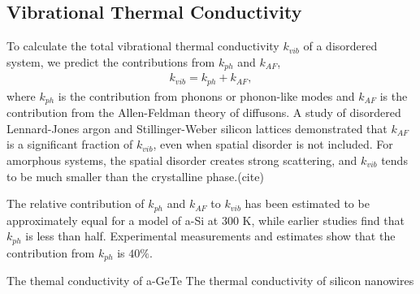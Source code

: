 \documentclass[aps,prb,twocolumn,superscriptaddress,footinbib,amsmath,amssymb,floatfix]{revtex4}
\begin{document}
\subsection{\label{S:Theory:Thermal}Vibrational Thermal Conductivity}

To calculate the total vibrational thermal conductivity $k_{vib}$ of a 
disordered system, we predict 
the contributions from $k_{ph}$ and $k_{AF}$, 
\begin{equation}
\begin{split}
k_{vib} = k_{ph} + k_{AF},
\end{split}
\end{equation}
where $k_{ph}$\cite{ashcroft} is the contribution from phonons or 
phonon-like modes and $k_{AF}$ is the contribution from the 
Allen-Feldman theory of diffusons.
\cite{feldman_thermal_1993,feldman_numerical_1999}
A study of disordered Lennard-Jones argon and Stillinger-Weber silicon 
lattices demonstrated that $k_{AF}$ is a significant fraction of $k_{vib}$, 
even when spatial disorder is not included. 
For amorphous systems, the 
spatial disorder creates strong scattering, and $k_{vib}$ tends to be 
much smaller than the crystalline phase.(cite)  

The relative contribution of $k_{ph}$ and $k_{AF}$ to $k_{vib}$ 
has been estimated 
to be approximately equal for a model of a-Si  
at 300 K,\cite{he_heat_2011} 
while earlier studies find that $k_{ph}$ is less than half.
\cite{feldman_thermal_1993,feldman_numerical_1999} Experimental 
measurements and estimates show that the contribution from 
$k_{ph}$ is $40\%$.\cite{liu_high_2009} 

The themal conductivity of a-GeTe \cite{sosso_thermal_2012}
The thermal conductivity of silicon nanowires \cite{donadio_atomistic_2009}
\end{document}
